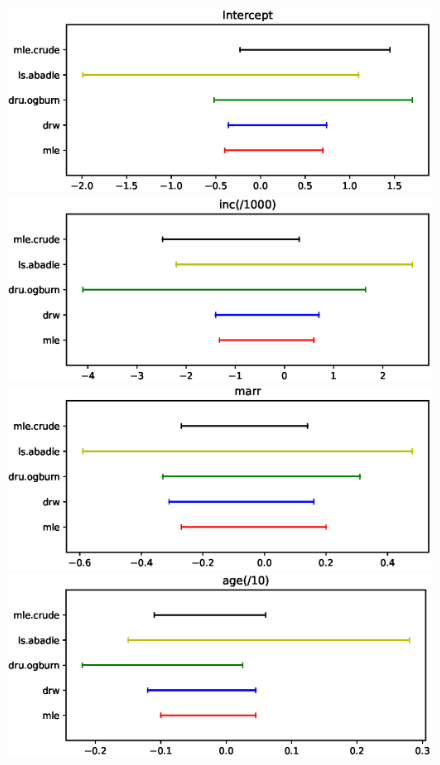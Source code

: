 \documentclass{article}
\begin{document}
\begin{figure}
\centering
\begin{minipage}{0.48\linewidth}
\includegraphics[width=\linewidth]{all0.eps}
\end{minipage}
\begin{minipage}{0.48\linewidth}
\includegraphics[width=\linewidth]{all1.eps}
\end{minipage}
\begin{minipage}{0.48\linewidth}
\includegraphics[width=\linewidth]{all2.eps}
\end{minipage}
\begin{minipage}{0.48\linewidth}
\includegraphics[width=\linewidth]{all3.eps}

\end{minipage}
\end{figure}
\end{document}
